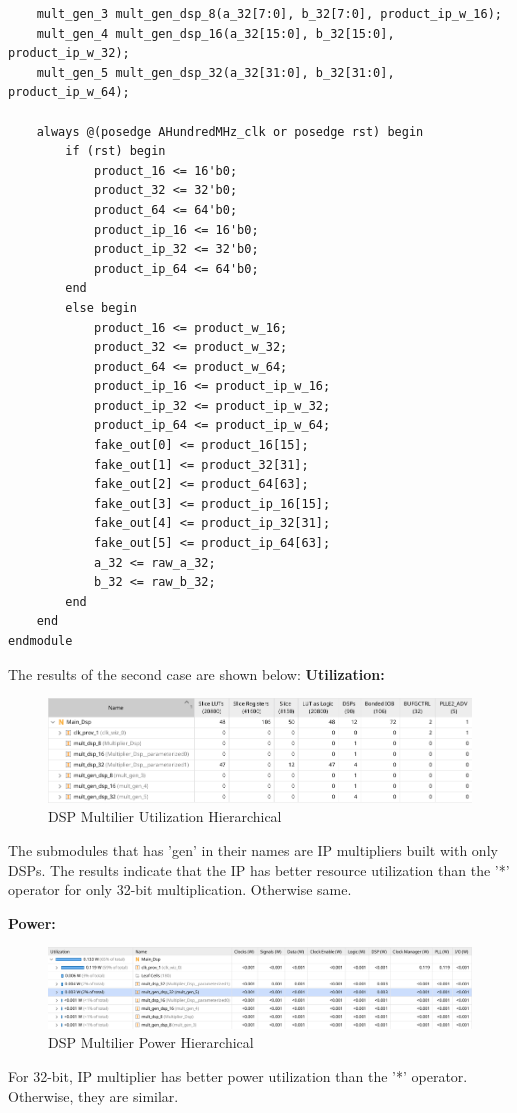 \documentclass{report}
\begin{document}
\begin{verbatim}
    mult_gen_3 mult_gen_dsp_8(a_32[7:0], b_32[7:0], product_ip_w_16);
    mult_gen_4 mult_gen_dsp_16(a_32[15:0], b_32[15:0], product_ip_w_32);
    mult_gen_5 mult_gen_dsp_32(a_32[31:0], b_32[31:0], product_ip_w_64);

    always @(posedge AHundredMHz_clk or posedge rst) begin
        if (rst) begin
            product_16 <= 16'b0;
            product_32 <= 32'b0;
            product_64 <= 64'b0;
            product_ip_16 <= 16'b0;
            product_ip_32 <= 32'b0;
            product_ip_64 <= 64'b0;
        end
        else begin
            product_16 <= product_w_16;
            product_32 <= product_w_32;
            product_64 <= product_w_64;
            product_ip_16 <= product_ip_w_16;
            product_ip_32 <= product_ip_w_32;
            product_ip_64 <= product_ip_w_64;
            fake_out[0] <= product_16[15];
            fake_out[1] <= product_32[31];
            fake_out[2] <= product_64[63];
            fake_out[3] <= product_ip_16[15];
            fake_out[4] <= product_ip_32[31];
            fake_out[5] <= product_ip_64[63];
            a_32 <= raw_a_32;
            b_32 <= raw_b_32;
        end
    end
endmodule
\end{verbatim}

The results of the second case are shown below:
\textbf{Utilization:}
\begin{figure}[ht]
    \includegraphics[width=1\linewidth]{images/MUL_DSP_Util.png}
    \centering
    \caption{DSP Multilier Utilization Hierarchical}
    \label{fig:dsp_util}
\end{figure}

The submodules that has 'gen' in their names are IP multipliers built with only DSPs. The results indicate that the IP has better resource utilization than the '*' operator for only 32-bit multiplication. Otherwise same.

\break
\textbf{Power:}

\begin{figure}[ht]
    \includegraphics[width=1\linewidth]{images/MUL_DSP_POWER.png}
    \centering
    \caption{DSP Multilier Power Hierarchical}
    \label{fig:dsp_power}
\end{figure}
For 32-bit, IP multiplier has better power utilization than the '*' operator. Otherwise, they are similar.
\end{document}
